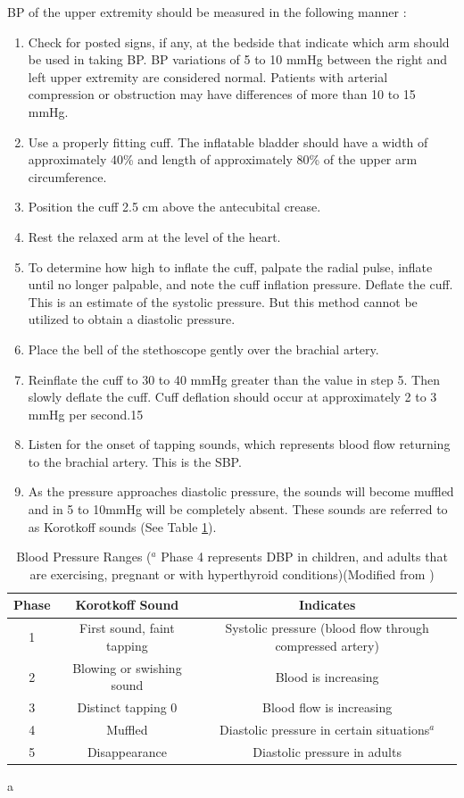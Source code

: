 BP of the upper extremity should be measured in the following manner \cite{collins_cardiac_2019}:

\begin{enumerate}
\item Check for posted signs, if any, at the bedside that indicate which arm should be used in taking BP. BP variations of 5 to 10 mmHg between the right and left upper extremity are considered normal. Patients with arterial compression or obstruction may have differences of more than 10 to 15 mmHg.
\item Use a properly fitting cuff. The inflatable bladder should have a width of approximately 40\% and length of approximately 80\% of the upper arm circumference.
\item Position the cuff 2.5 cm above the antecubital crease.
\item Rest the relaxed arm at the level of the heart.
\item To determine how high to inflate the cuff, palpate the radial pulse, inflate until no longer palpable, and note the cuff inflation pressure. Deflate the cuff. This is an estimate of the systolic pressure. But this method cannot be utilized to obtain a diastolic pressure.
\item Place the bell of the stethoscope gently over the brachial artery.
\item Reinflate the cuff to 30 to 40 mmHg greater than the value in step 5. Then slowly deflate the cuff. Cuff deflation should occur at approximately 2 to 3 mmHg per second.15
\item Listen for the onset of tapping sounds, which represents blood flow returning to the brachial artery. This is the SBP.
\item As the pressure approaches diastolic pressure, the sounds will become muffled and in 5 to 10mmHg will be completely absent. These sounds are referred to as Korotkoff sounds (See Table \ref{Korotkoff}).
\end{enumerate}

\begin{table}[h!]
\centering
\begin{tabular}{||c c c ||} 
 \hline
 Phase & Korotkoff Sound & Indicates \\ [0.5ex] 
 \hline\hline
1  & First sound, faint tapping  & Systolic pressure (blood flow through compressed artery)  \\ 
2  & Blowing or swishing sound  & Blood is increasing   \\
3 & Distinct tapping 0   & Blood flow is increasing   \\
4 & Muffled  & Diastolic pressure in certain situations$^a$\\
5 & Disappearance  & Diastolic pressure in adults   \\ [1ex] 
 \hline
\end{tabular}
\caption{Blood Pressure Ranges ($^a$ \footnotesize{Phase 4 represents DBP in children, and adults that are exercising, pregnant or with hyperthyroid conditions})(Modified from \cite{bickley_bates_2012})}a
\label{Korotkoff}
\end{table}

